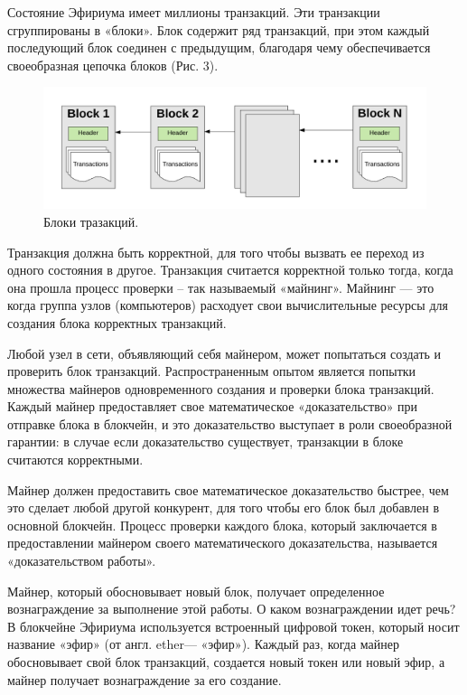 \documentclass{article}
\begin{document}
Состояние Эфириума имеет миллионы транзакций. Эти транзакции сгруппированы в «блоки». Блок содержит ряд транзакций, при этом каждый последующий блок соединен с предыдущим, благодаря чему обеспечивается своеобразная цепочка блоков (Рис. 3).


\begin{figure}
    \centering
    \includegraphics[scale=0.3]{scheme_3}
    \caption{Блоки тразакций.}
    \label{fig:scheme_3}
\end{figure}


Транзакция должна быть корректной, для того чтобы вызвать ее переход из одного состояния в другое. Транзакция считается корректной только тогда, когда она прошла процесс проверки – так называемый «майнинг». Майнинг — это когда группа узлов (компьютеров) расходует свои вычислительные ресурсы для создания блока корректных транзакций.

Любой узел в сети, объявляющий себя майнером, может попытаться создать и проверить блок транзакций. Распространенным опытом является попытки множества майнеров одновременного создания и проверки блока транзакций. Каждый майнер предоставляет свое математическое «доказательство» при отправке блока в блокчейн, и это доказательство выступает в роли своеобразной гарантии: в случае если доказательство существует, транзакции в блоке считаются корректными.

Майнер должен предоставить свое математическое доказательство быстрее, чем это сделает любой другой конкурент, для того чтобы его блок был добавлен в основной блокчейн. Процесс проверки каждого блока, который заключается в предоставлении майнером своего математического доказательства, называется «доказательством работы».

Майнер, который обосновывает новый блок, получает определенное вознаграждение за выполнение этой работы. О каком вознаграждении идет речь? В блокчейне Эфириума используется встроенный цифровой токен, который носит название «эфир» (от англ. ether— «эфир»). Каждый раз, когда майнер обосновывает свой блок транзакций, создается новый токен или новый эфир, а майнер получает вознаграждение за его создание.
\end{document}
